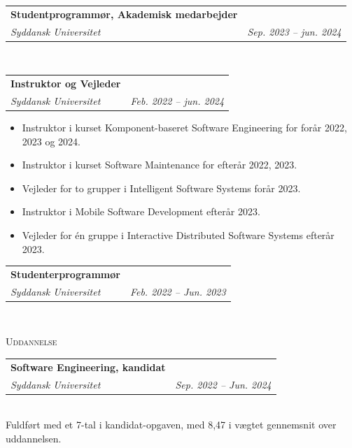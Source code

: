 \documentclass[11pt]{article}
\makeatletter
\newcommand{\resumeSubheading}[4]{
  \noindent\begin{tabular*}{0.98\textwidth}[t]{l@{\extracolsep{\fill}}r}
    \noindent \textbf{#3} & \textit{\small #2} \\ \vspace{-3pt} 
    \noindent \textit{\small #1} & \textit{\small #4} 
  \end{tabular*}\vspace{7pt}
}
\makeatother
\begin{document}
\resumeSubheading{Syddansk Universitet}{}{Studentprogrammør, Akademisk
medarbejder}{Sep. 2023 -- jun. 2024}\\

\vspace{0.3cm}
\resumeSubheading{Syddansk Universitet}{}{Instruktor og Vejleder}{Feb. 2022 -- jun. 2024}
\vspace{-0.2cm}
\begin{itemize}[itemsep=0pt]
  \small
  \item Instruktor i kurset Komponent-baseret Software Engineering for forår 2022, 2023 og 2024.
  \item Instruktor i kurset Software Maintenance for efterår 2022, 2023. 
  \item Vejleder for to grupper i Intelligent Software Systems forår 2023. 
  \item Instruktor i Mobile Software Development efterår 2023.  
  \item Vejleder for én gruppe i Interactive Distributed Software Systems efterår 2023.
\end{itemize}


\vspace{0.3cm}
\resumeSubheading{Syddansk Universitet}{}{Studenterprogrammør}{Feb. 2022 -- Jun. 2023}\\

\newpage
\noindent\large{\scshape{Uddannelse}} \newline
\noindent{\rule[0.3cm]{\textwidth}{0.4pt}}

\resumeSubheading{Syddansk Universitet}{}{Software Engineering, kandidat}{Sep.
2022 -- Jun. 2024}\\\vspace{0.25cm}
  \vspace{-0.3cm}
  {\indent\small Fuldført med et 7-tal i kandidat-opgaven, med 8,47 i vægtet
  gennemsnit over uddannelsen.}
\end{document}
